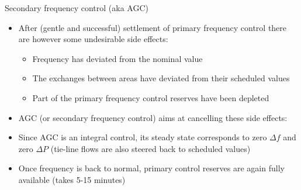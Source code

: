 \begin{frame} {Secondary frequency control (aka AGC)}
    \begin{itemize}
        \item After (gentle and successful) settlement of primary frequency control there are however some undesirable side effects:
        \begin{itemize}
            \item Frequency has deviated from the nominal value
            \item The exchanges between areas have deviated from their scheduled values
            \item Part of the primary frequency control reserves have been depleted
        \end{itemize}
        \item AGC (or secondary frequency control) aims at cancelling these side effects:
    \end{itemize}
    \begin{itemize}
        \item Since AGC is an integral control, its steady state corresponds to zero $\Delta f$ and zero $\Delta P$ (tie-line flows are also steered back to scheduled values)
        \item Once frequency is back to normal, primary control reserves are again fully available (takes 5-15 minutes)
    \end{itemize}
\end{frame}

